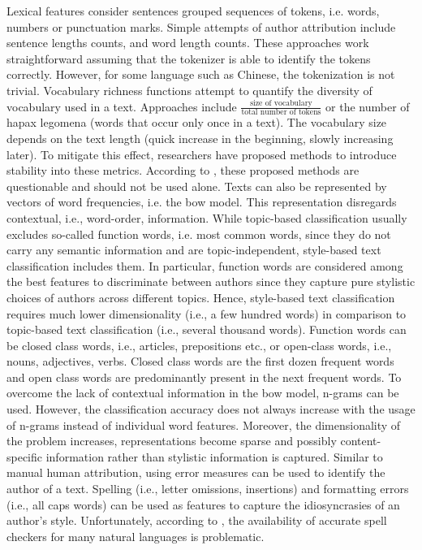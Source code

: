 Lexical features consider sentences grouped sequences of tokens, i.e. words, numbers or punctuation marks.
Simple attempts of author attribution include sentence lengths counts, and word length counts.
These approaches work straightforward assuming that the tokenizer is able to identify the tokens correctly.
However, for some language such as Chinese, the tokenization is not trivial.
Vocabulary richness functions attempt to quantify the diversity of vocabulary used in a text.
Approaches include $\frac{\text{size of vocabulary}}{\text{total number of tokens}}$ or the 
number of hapax legomena (words that occur only once in a text).
The vocabulary size depends on the text length (quick increase in the beginning, slowly increasing later).
To mitigate this effect, researchers have proposed methods to introduce stability into these metrics. 
According to \citet{stamatatos_survey_2009}, these proposed methods are questionable and should not be used alone.
Texts can also be represented by vectors of word frequencies, i.e. the \ac{bow} model.
This representation disregards contextual, i.e., word-order, information.
While topic-based classification usually excludes so-called function words, 
i.e. most common words, since they do not carry any semantic information and are topic-independent, 
style-based text classification includes them.
In particular, function words are considered among the best features to discriminate between authors 
since they capture pure stylistic choices of authors across different topics.
Hence, style-based text classification requires much lower dimensionality (i.e., a few hundred words) 
in comparison to topic-based text classification (i.e., several thousand words).
Function words can be closed class words, i.e., articles, prepositions etc., 
or open-class words, i.e., nouns, adjectives, verbs.
Closed class words are the first dozen frequent words and 
open class words are predominantly present in the next frequent words.
To overcome the lack of contextual information in the \ac{bow} model, 
n-grams can be used.
However, the classification accuracy does not always increase with the usage of n-grams instead of individual word features.
Moreover, the dimensionality of the problem increases, representations become sparse and possibly content-specific information rather than stylistic information is captured.
Similar to manual human attribution, using error measures can be used to identify the author of a text.
Spelling (i.e., letter omissions, insertions) and formatting errors (i.e., all caps words) can be used as features 
to capture the idiosyncrasies of an author's style.
Unfortunately, according to \cite{stamatatos_survey_2009}, the availability of accurate spell checkers for many natural languages is problematic.


